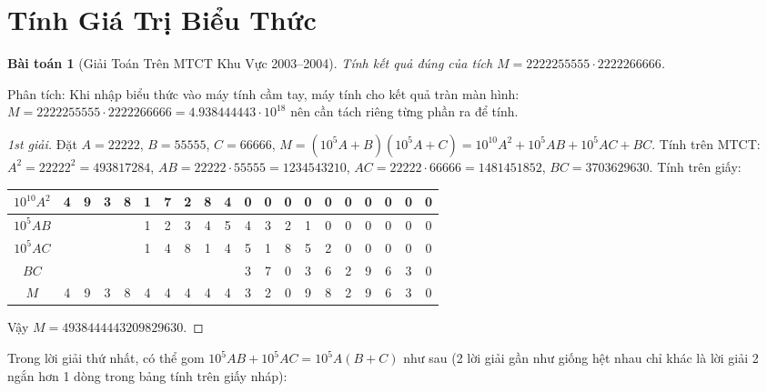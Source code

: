 \documentclass{article}
\newtheorem{baitoan}{Bài toán}
\begin{document}

\section{Tính Giá Trị Biểu Thức}

\begin{baitoan}[Giải Toán Trên MTCT Khu Vực 2003--2004]
	Tính kết quả đúng của tích $M = 2222255555\cdot2222266666$.
\end{baitoan}
\noindent\textsf{Phân tích}: Khi nhập biểu thức vào máy tính cầm tay, máy tính cho kết quả tràn màn hình: $M = 2222255555\cdot2222266666 = 4.938444443\cdot10^{18}$ nên cần tách riêng từng phần ra để tính.

\begin{proof}[1st giải]
	Đặt $A = 22222$, $B = 55555$, $C = 66666$, $M = (10^5A + B)(10^5A + C) = 10^{10}A^2 + 10^5AB + 10^5AC + BC$. Tính trên MTCT: $A^2 = 22222^2 = 493817284$, $AB = 22222\cdot55555 = 1234543210$, $AC = 22222\cdot66666 = 1481451852$, $BC = 3703629630$. Tính trên giấy:
	\begin{table}[H]
		\centering
		\begin{tabular}{|c|c|c|c|c|c|c|c|c|c|c|c|c|c|c|c|c|c|c|c|}
			\hline
			$10^{10}A^2$ & 4 & 9 & 3 & 8 & 1 & 7 & 2 & 8 & 4 & 0 & 0 & 0 & 0 & 0 & 0 & 0 & 0 & 0 & 0 \\
			\hline
			$10^5AB$ &  &  &  &  & 1 & 2 & 3 & 4 & 5 & 4 & 3 & 2 & 1 & 0 & 0 & 0 & 0 & 0 & 0 \\
			\hline
			$10^5AC$ &  &  &  &  & 1 & 4 & 8 & 1 & 4 & 5 & 1 & 8 & 5 & 2 & 0 & 0 & 0 & 0 & 0 \\
			\hline
			$BC$ &  &  &  &  &  &  &  &  &  & 3 & 7 & 0 & 3 & 6 & 2 & 9 & 6 & 3 & 0 \\
			\hline
			$M$ & 4 & 9 & 3 & 8 & 4 & 4 & 4 & 4 & 4 & 3 & 2 & 0 & 9 & 8 & 2 & 9 & 6 & 3 & 0 \\
			\hline
		\end{tabular}
	\end{table}
	\noindent Vậy $M = 4938444443209829630$.
\end{proof}
Trong lời giải thứ nhất, có thể gom $10^5AB + 10^5AC = 10^5A(B + C)$ như sau (2 lời giải gần như giống hệt nhau chỉ khác là lời giải 2 ngắn hơn 1 dòng trong bảng tính trên giấy nháp):
\end{document}
